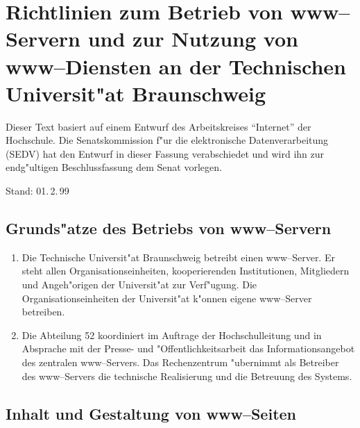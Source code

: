 
\section[WWW-Richtlinien an der TU Braunschweig]{Richtlinien zum Betrieb von
  www--Servern und zur Nutzung von www--Diensten an der Technischen
  Universit"at Braunschweig}
\label{www-Richtlinien}

{\small Dieser Text basiert auf einem Entwurf des Arbeitskreises "`Internet"'
  der Hochschule. Die Senatskommission f"ur die elektronische Datenverarbeitung
  (SEDV) hat den Entwurf in dieser Fassung verabschiedet und wird ihn zur
  endg"ultigen Beschlussfassung dem Senat vorlegen.

  Stand: 01.\,2.\,99}

\subsection{Grunds"atze des Betriebs von www--Servern}

\begin{enumerate}
  \item Die Technische Universit"at Braunschweig betreibt einen
        www--Server. Er steht allen Organisationseinheiten, kooperierenden
        Institutionen, Mitgliedern und Angeh"origen der
        Universit"at zur Verf"ugung. Die Organisationseinheiten
        der Universit"at k"onnen eigene www--Server betreiben.

  \item Die Abteilung 52 koordiniert im Auftrage der Hochschulleitung und
        in Absprache mit der Presse- und "Offentlichkeitsarbeit
        das Informationsangebot des zentralen www--Servers. Das
        Rechenzentrum "ubernimmt als Betreiber des www--Servers die
        technische Realisierung und die Betreuung des Systems.
\end{enumerate}

\subsection{Inhalt und Gestaltung von www--Seiten}

